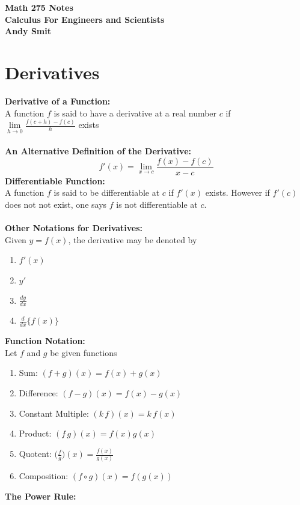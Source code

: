 \documentclass[14pt]{article}
\begin{document}
    \begin{center}
        \textbf{Math 275 Notes\\ Calculus For Engineers and Scientists\\Andy Smit}
    \end{center}
    \section{Derivatives}
    \textbf{Derivative of a Function: }\\
    A function $f$ is said to have a derivative at a real number $c$ if \\$\lim \limits_{h\rightarrow 0} \frac{f(c+h)-f(c)}{h}$ exists
    \\\\
    \textbf{An Alternative Definition of the Derivative:}
    $$f'(x)=\lim \limits_{x \rightarrow c} \frac{f(x)-f(c)}{x-c}$$
    \textbf{Differentiable Function:}\\
    A function $f$ is said to be differentiable at $c$ if $f'(x)$ exists. However if $f'(c)$ does not not exist, one says $f$ is not differentiable at $c$.
    \\\\
    \textbf{Other Notations for Derivatives:}\\
    Given $y=f(x)$, the derivative may be denoted by
    \begin{enumerate}
        \item $f'(x)$
        \item $y'$
        \item $\frac{dy}{dx}$
        \item $\frac{d}{dx} \Big\{f(x)\Big\}$
    \end{enumerate}
    \textbf{Function Notation:}\\
    Let $f$ and $g$ be given functions
    \begin{enumerate}
        \item Sum: $(f+g)(x)=f(x)+g(x)$
        \item Difference: $(f-g)(x)=f(x)-g(x)$
        \item Constant Multiple: $(k\, f)(x)=k\,f(x)$
        \item Product: $(f\,g)(x)=f(x)g(x)$
        \item Quotent: $\bigg(\frac{f}{g}\bigg)(x)=\frac{f(x)}{g(x)}$
        \item Composition: $(f \circ g)(x)=f(g(x))$
    \end{enumerate}
    \textbf{The Power Rule:}
\end{document}
